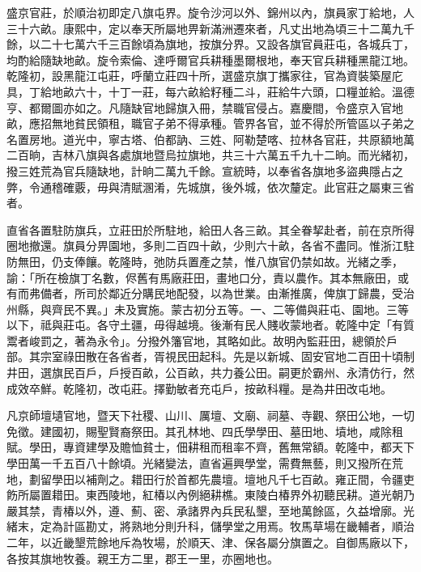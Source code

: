 \begin{pinyinscope}
盛京官莊，於順治初即定八旗屯界。旋令沙河以外、錦州以內，旗員家丁給地，人三十六畝。康熙中，定以奉天所屬地畀新滿洲遷來者，凡丈出地為頃三十二萬九千餘，以二十七萬六千三百餘頃為旗地，按旗分界。又設各旗官員莊屯，各城兵丁，均酌給隨缺地畝。旋令索倫、達呼爾官兵耕種墨爾根地，奉天官兵耕種黑龍江地。乾隆初，設黑龍江屯莊，呼蘭立莊四十所，選盛京旗丁攜家往，官為資裝築屋庀具，丁給地畝六十，十丁一莊，每六畝給籽種二斗，莊給牛六頭，口糧並給。溫德亨、都爾圖亦如之。凡隨缺官地歸旗入冊，禁職官侵占。嘉慶間，令盛京入官地畝，應招無地貧民領租，職官子弟不得承種。管界各官，並不得於所管區以子弟之名置房地。道光中，寧古塔、伯都訥、三姓、阿勒楚喀、拉林各官莊，共原額地萬二百晌，吉林八旗與各處旗地暨烏拉旗地，共三十六萬五千九十二晌。而光緒初，撥三姓荒為官兵隨缺地，計晌二萬九千餘。宣統時，以奉省各旗地多盜典隱占之弊，令通稽確覈，毋與清賦溷淆，先城旗，後外城，依次釐定。此官莊之屬東三省者。

直省各置駐防旗兵，立莊田於所駐地，給田人各三畝。其全眷挈赴者，前在京所得圈地撤還。旗員分畀園地，多則二百四十畝，少則六十畝，各省不盡同。惟浙江駐防無田，仍支俸饟。乾隆時，弛防兵置產之禁，惟八旗官仍禁如故。光緒之季，諭：「所在檢旗丁名數，侭舊有馬廠莊田，畫地口分，責以農作。其本無廠田，或有而弗備者，所司於鄰近分購民地配發，以為世業。由漸推廣，俾旗丁歸農，受治州縣，與齊民不異。」未及實施。蒙古初分五等。一、二等備與莊屯、園地。三等以下，祗與莊屯。各守土疆，毋得越境。後漸有民人賤收蒙地者。乾隆中定「有質鬻者峻罰之，著為永令」。分撥外籓官地，其略如此。故明內監莊田，總領於戶部。其宗室祿田散在各省者，胥視民田起科。先是以新城、固安官地二百田十頃制井田，選旗民百戶，戶授百畝，公百畝，共力養公田。嗣更於霸州、永清仿行，然成效卒鮮。乾隆初，改屯莊。擇勤敏者充屯戶，按畝科糧。是為井田改屯地。

凡京師壇壝官地，暨天下社稷、山川、厲壇、文廟、祠墓、寺觀、祭田公地，一切免徵。建國初，賜聖賢裔祭田。其孔林地、四氏學學田、墓田地、墳地，咸除租賦。學田，專資建學及贍恤貧士，佃耕租而租率不齊，舊無常額。乾隆中，都天下學田萬一千五百八十餘頃。光緒變法，直省遍興學堂，需費無藝，則又撥所在荒地，劃留學田以補劑之。耤田行於首都先農壇。壇地凡千七百畝。雍正間，令疆吏飭所屬置耤田。東西陵地，紅椿以內例絕耕樵。東陵白椿界外初聽民耕。道光朝乃嚴其禁，青椿以外，遵、薊、密、承諸界內兵民私墾，至地萬餘區，久益增廓。光緒末，定為計區勘丈，將熟地分則升科，儲學堂之用焉。牧馬草場在畿輔者，順治二年，以近畿墾荒餘地斥為牧場，於順天、津、保各屬分旗置之。自御馬廠以下，各按其旗地牧養。親王方二里，郡王一里，亦圈地也。


\end{pinyinscope}
